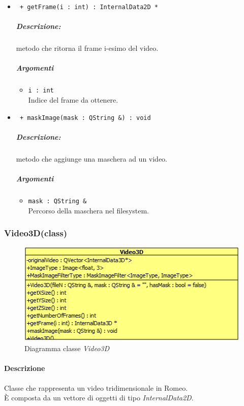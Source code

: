 \begin{itemize}
		\item \color{blue}\verb! + getFrame(i : int) : InternalData2D * !\\
		\color{black}
		\subparagraph{Descrizione:} metodo che ritorna il frame i-esimo del video.
		\subparagraph{Argomenti}
				\begin{itemize}
					\item \color{RoyalPurple}\verb!i : int !\\
					\color{black}Indice del frame da ottenere.
				\end{itemize}
		
		\item \color{blue}\verb! + maskImage(mask : QString &) : void !\\
		\color{black}
		\subparagraph{Descrizione:} metodo che aggiunge una maschera ad un video.
		\subparagraph{Argomenti}
				\begin{itemize}
					\item \color{RoyalPurple}\verb!mask : QString & !\\
					\color{black}Percorso della maschera nel filesystem.
				\end{itemize}
				
	\end{itemize}
	
\pagebreak
\subsubsection{Video3D(class)}
\label{Video3D}
\begin{figure}[!h]
\centering
			\includegraphics[scale=1]{./Content/Immagini/modelCore/Video3D.png}
			\caption{Diagramma classe \textsl{Video3D}}
			\label{Video3D_img}
\end{figure}

\paragraph{Descrizione \\}
Classe che rappresenta un video tridimensionale in Romeo\g{}.
\\È composta da un vettore di oggetti di tipo \textsl{InternalData2D}.

